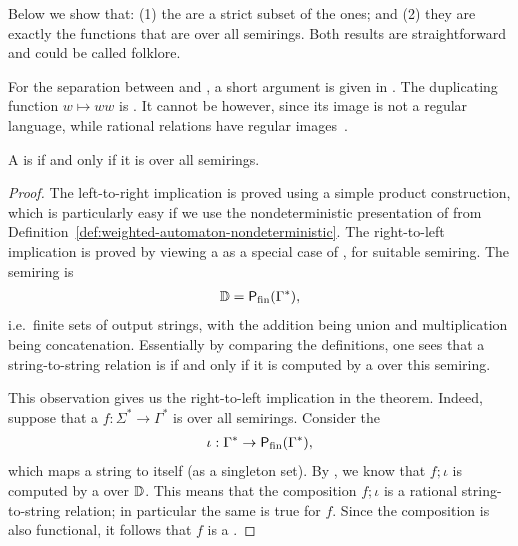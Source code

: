 \AP
Below we show that: (1) the  are a
strict subset of the  ones; and (2) they are exactly the
functions that are  over all semirings. Both results are
straightforward and could be called folklore.

\begin{myexample}
    For the separation between  and 
    , a short argument is given in 
    \cite[p. 218]{engelfrietMSODefinableString2001}. 
    The duplicating function $w \mapsto ww$ is .
    It cannot be  
    however, since its image is not a regular language, 
    while rational relations have regular images~\cite[Theorem IX.3.1]{Eilenberg74}.
\end{myexample}

\begin{theorem}\label{thm:rational-functions}
  \AP
  A  is  if and only if it is 
   over all semirings.
\end{theorem}
\begin{proof}
    The left-to-right implication is proved using a simple product
    construction, which is particularly easy if we use the nondeterministic
    presentation of  from
    Definition~\ref{def:weighted-automaton-nondeterministic}. The right-to-left
    implication is proved by viewing a  as a
    special case of , for suitable semiring. The semiring is 
    \begin{align*}
    \mathbb D = \mathsf{P}_{\mathrm{fin}}(\Gamma^*),
    \end{align*}
    i.e.~finite sets of output strings, with the addition being union and
    multiplication being concatenation. Essentially by comparing the
    definitions, one sees that a string-to-string relation is 
    if and only if it is computed by a  over this semiring. 

    This observation gives us the right-to-left implication in the theorem.
    Indeed, suppose that a  $f : \Sigma^* \to
    \Gamma^*$ is  over all semirings. 
    Consider the 
    \begin{align*}
    \iota : \Gamma^* \to \mathsf{P}_{\mathrm{fin}}(\Gamma^*),
    \end{align*}
    which maps a string to itself (as a singleton set). By , we know
    that $f; \iota$ is computed by a  over $\mathbb D$. This
    means that the composition $f;\iota$ is a rational string-to-string
    relation; in particular the same is true for $f$. Since the composition is
    also functional, it follows that $f$ is a .
\end{proof}


